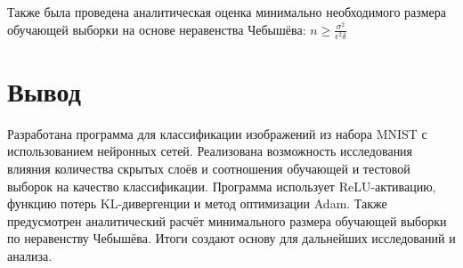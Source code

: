Также была проведена аналитическая оценка минимально необходимого размера обучающей выборки на основе неравенства Чебышёва:
\begin{math}
    n \geq \frac{\sigma^2}{\epsilon^2 \delta}
\end{math} \cite{lib:chebyshev}

\section*{Вывод}

Разработана программа для классификации изображений из набора MNIST с использованием нейронных сетей. 
Реализована возможность исследования влияния количества скрытых слоёв и соотношения обучающей и тестовой выборок на качество классификации. 
Программа использует ReLU-активацию, функцию потерь KL-дивергенции и метод оптимизации Adam. 
Также предусмотрен аналитический расчёт минимального размера обучающей выборки по неравенству Чебышёва. 
Итоги создают основу для дальнейших исследований и анализа.

\clearpage
